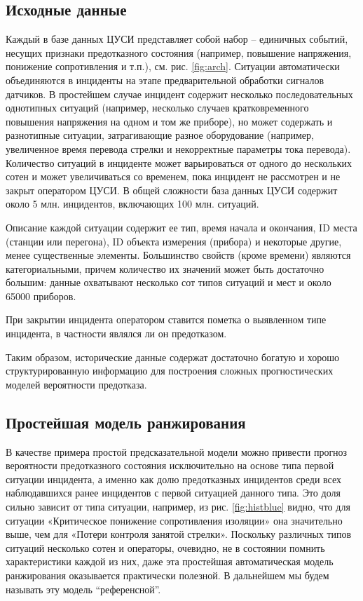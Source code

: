 \subsection{Исходные данные}
Каждый  в базе данных ЦУСИ представляет собой набор  -- единичных событий, несущих признаки предотказного состояния (например, повышение напряжения, понижение сопротивления и т.п.), см. рис. \ref{fig:arch}. Ситуации автоматически объединяются в инциденты на этапе предварительной обработки сигналов датчиков. В простейшем случае инцидент содержит несколько последовательных однотипных ситуаций (например, несколько случаев кратковременного повышения напряжения на одном и том же приборе), но может содержать и разнотипные ситуации, затрагивающие разное оборудование (например, увеличенное время перевода стрелки и некорректные параметры тока перевода). Количество ситуаций в инциденте может варьироваться от одного до нескольких сотен и может увеличиваться со временем, пока инцидент не рассмотрен и не закрыт оператором ЦУСИ. В общей сложности база данных ЦУСИ содержит около 5 млн. инцидентов, включающих 100 млн. ситуаций.  

Описание каждой ситуации содержит ее тип, время начала и окончания, 
ID места (станции или перегона), ID объекта измерения (прибора) и некоторые другие, менее существенные элементы. Большинство свойств (кроме времени) являются категориальными, причем количество их значений может быть достаточно большим: данные охватывают несколько сот типов ситуаций и мест и около 65000 приборов.

При закрытии инцидента оператором ставится пометка о выявленном типе инцидента, в частности являлся ли он предотказом. 

Таким образом, исторические данные содержат достаточно богатую и хорошо структурированную информацию для построения сложных прогностических моделей вероятности предотказа.    

\subsection{Простейшая модель ранжирования}\label{sec:ref_model} 

В качестве примера простой предсказательной модели можно привести прогноз вероятности предотказного состояния исключительно на основе типа первой ситуации инцидента, а именно как долю предотказных инцидентов среди всех наблюдавшихся ранее инцидентов с первой ситуацией данного типа. Это доля сильно зависит от типа ситуации, например, из рис. \ref{fig:histblue} видно, что для ситуации «Критическое понижение сопротивления изоляции» она значительно выше, чем для «Потери контроля занятой стрелки». Поскольку различных типов ситуаций несколько сотен и операторы, очевидно, не в состоянии помнить характеристики каждой из них, даже эта простейшая автоматическая модель ранжирования оказывается практически полезной. В дальнейшем мы будем называть эту модель ``референсной''.  

